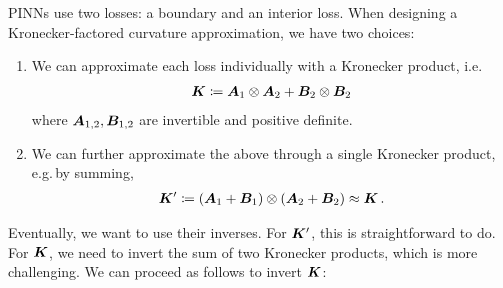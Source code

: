 PINNs use two losses: a boundary and an interior loss.
When designing a Kronecker-factored curvature approximation, we have two choices:
\begin{enumerate}
\item We can approximate each loss individually with a Kronecker product, i.e.
  \begin{align*}
    {\bm{K}} \coloneqq {\bm{A}}_1 \otimes {\bm{A}}_2 + {\bm{B}}_2 \otimes {\bm{B}}_2
  \end{align*}
  where ${\bm{A}}_{1,2}, {\bm{B}}_{1,2}$ are invertible and positive definite.

\item We can further approximate the above through a single Kronecker product, e.g.\,by summing,
  \begin{align*}
    {\bm{K}}' \coloneqq ({\bm{A}}_1 + {\bm{B}}_1) \otimes ({\bm{A}}_2 + {\bm{B}}_2) \approx {\bm{K}}\,.
  \end{align*}
\end{enumerate}
Eventually, we want to use their inverses.
For ${\bm{K}}'$, this is straightforward to do.
For ${\bm{K}}$, we need to invert the sum of two Kronecker products, which is more challenging.
We can proceed as follows to invert ${\bm{K}}$:
